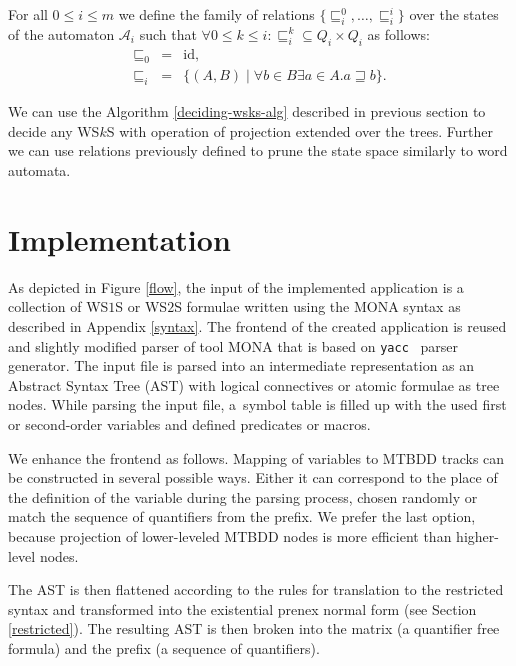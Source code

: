 \begin{defz}
For all $0 \leq i \leq m$ we define the family of relations
$\{\sqsubseteq_i^0,\ldots,\sqsubseteq^i_i\}$ over the states of the automaton
$\mathcal{A}_i$ such that $\forall 0 \leq k \leq i: \sqsubseteq_i^k\subseteq Q_i
\times Q_i$ as follows:
\begin{eqnarray}
 \sqsubseteq_0 & = & \text{id},\\
 \sqsubseteq_i & = & \{(A, B) \mid \forall b \in B \exists a \in A. a
 \sqsupseteq b\}.
\end{eqnarray}
\end{defz}

We can use the Algorithm \ref{deciding-wsks-alg} described in previous section
to decide any WS$k$S with operation of projection extended over the trees.
Further we can use relations previously defined to prune the state space
similarly to word automata.

\chapter{Implementation}\label{impl}

As depicted in Figure \ref{flow}, the input of the implemented application is
a collection of WS$1$S or WS$2$S formulae written using the \textsc{MONA}
syntax as described in Appendix \ref{syntax}. The frontend of the
created application is reused and slightly modified parser of tool \textsc{MONA}
that is based on \texttt{yacc}~\cite{yacc} parser generator. The input file is
parsed into an intermediate representation as an Abstract Syntax
Tree (AST) with logical connectives or atomic formulae as
tree nodes. While parsing the input file, a~symbol table is filled up with the
used first or second-order variables and defined predicates or macros. 

We enhance the frontend as follows. Mapping of variables to MTBDD tracks
can be constructed in several possible ways.
Either it can correspond to the place of the definition of the variable during
the parsing process, chosen randomly or match the sequence of quantifiers from
the prefix. We prefer the last option, because projection of lower-leveled MTBDD
nodes is more efficient than higher-level nodes.

The AST is then flattened according to the rules for translation to
the restricted syntax and transformed into
the existential prenex normal form (see Section \ref{restricted}). The resulting
AST is then broken into the matrix (a quantifier free formula) and the
prefix (a sequence of quantifiers).

